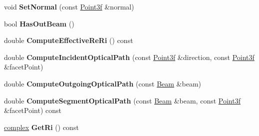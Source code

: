 \begin{DoxyCompactItemize}
\mbox{\label{class_splitting_aa1252b1e8aee523ea0ab4ee722ef7467}} 
void {\bfseries Set\+Normal} (const \mbox{\hyperlink{struct_point3f}{Point3f}} \&normal)
\item 
\mbox{\label{class_splitting_ad4060c2453300335aac5f4433df576f3}} 
bool {\bfseries Has\+Out\+Beam} ()
\item 
\mbox{\label{class_splitting_a758d5a6c2893c082764112986455f8bb}} 
double {\bfseries Compute\+Effective\+Re\+Ri} () const
\item 
\mbox{\label{class_splitting_a5dbc1990cfed9334c579bc3b0a882e52}} 
double {\bfseries Compute\+Incident\+Optical\+Path} (const \mbox{\hyperlink{struct_point3f}{Point3f}} \&direction, const \mbox{\hyperlink{struct_point3f}{Point3f}} \&facet\+Point)
\item 
\mbox{\label{class_splitting_a354a90a3b99b3428b165843e45512542}} 
double {\bfseries Compute\+Outgoing\+Optical\+Path} (const \mbox{\hyperlink{class_beam}{Beam}} \&beam)
\item 
\mbox{\label{class_splitting_abd26e93fb5f2386407ff26f29707c699}} 
double {\bfseries Compute\+Segment\+Optical\+Path} (const \mbox{\hyperlink{class_beam}{Beam}} \&beam, const \mbox{\hyperlink{struct_point3f}{Point3f}} \&facet\+Point) const
\item 
\mbox{\label{class_splitting_a7be9d71b2d09439747480d4f3446cc2f}} 
\mbox{\hyperlink{classcomplex}{complex}} {\bfseries Get\+Ri} () const
\end{DoxyCompactItemize}
